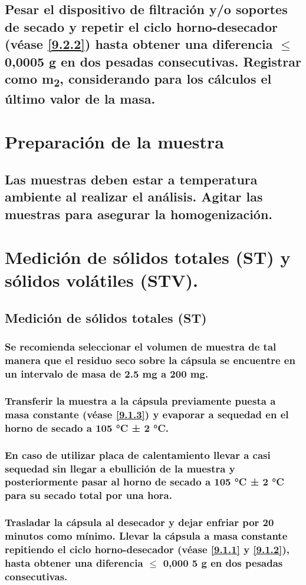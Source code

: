 \documentclass[spanish,12pt,letterpaper,titlepage]{article}
\theoremstyle{definition}
\begin{document}
	\subsection{Pesar el dispositivo de filtración y/o soportes de secado y repetir el ciclo horno-desecador (véase \ref{9.2.2}) hasta obtener una diferencia $\leq$ 0,0005 g en dos pesadas consecutivas. Registrar como m\textsubscript{2}, considerando para los cálculos el último valor de la masa.}\label{9.2.3}
	\section{Preparación de la muestra}\label{9.3}
	\subsection{Las muestras deben estar a temperatura ambiente al realizar el análisis. Agitar las muestras para asegurar la homogenización.}\label{9.3.1}
	\section{Medición de sólidos totales (ST) y sólidos volátiles (STV).}\label{9.4}
	\subsection{Medición de sólidos totales (ST)}\label{9.4.1}
	\subsubsection{Se recomienda seleccionar el volumen de muestra de tal manera que el residuo seco sobre la cápsula se encuentre en un intervalo de masa de 2.5 mg a 200 mg.}\label{9.4.1.1}
	\subsubsection{Transferir la muestra a la cápsula previamente puesta a masa constante (véase \ref{9.1.3}) y evaporar a sequedad en el horno de secado a 105 °C ± 2 °C.}\label{9.4.1.2}
	\subsubsection{En caso de utilizar placa de calentamiento llevar a casi sequedad sin llegar a ebullición de la muestra y posteriormente pasar al horno de secado a 105 °C ± 2 °C para su secado total por una hora.}\label{9.4.1.3}
	\subsubsection{Trasladar la cápsula al desecador y dejar enfriar por 20 minutos como mínimo. Llevar la cápsula a masa constante repitiendo el ciclo horno-desecador (véase \ref{9.1.1} y \ref{9.1.2}), hasta obtener una diferencia $\leq$ 0,000 5 g en dos pesadas consecutivas.}\label{9.4.1.4}
\end{document}
